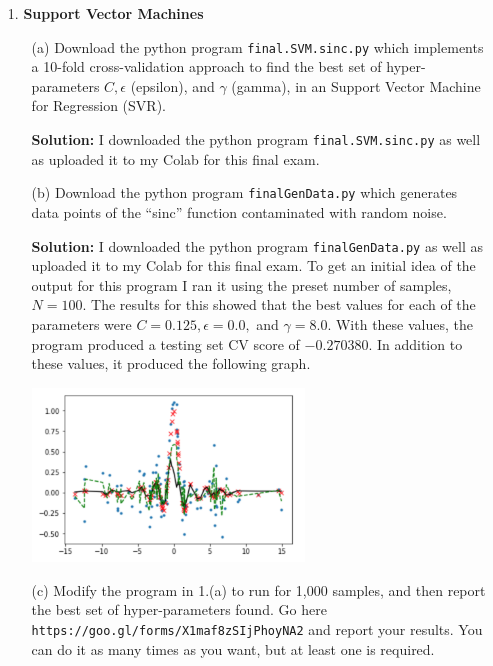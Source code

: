 \documentclass[a4paper]{article}
\begin{document}
\begin{enumerate}
    \item[1.] \textbf{Support Vector Machines}
    \begin{itemize}
        \item[(a)] Download the python program \verb|final.SVM.sinc.py| which implements a 
        10-fold cross-validation approach to find the best set of hyper-parameters $C, \epsilon$ 
        (epsilon), and $\gamma$ (gamma), in an Support Vector Machine for Regression (SVR).

        \textbf{Solution:} I downloaded the python program \verb|final.SVM.sinc.py| as well as 
        uploaded it to my Colab for this final exam.  

        \item[(b)] Download the python program \verb|finalGenData.py| which generates data points 
        of the ``sinc'' function contaminated with random noise.
        
        \textbf{Solution:} I downloaded the python program \verb|finalGenData.py| as well as 
        uploaded it to my Colab for this final exam.  To get an initial idea of the output for 
        this program I ran it using the preset number of samples, $N = 100$.  The results for this 
        showed that the best values for each of the parameters were $C = 0.125, \epsilon = 0.0,$ 
        and $\gamma = 8.0$.  With these values, the program produced a testing set CV score of 
        $-0.270380$.  In addition to these values, it produced the following graph.
        \begin{center}
            \includegraphics[width=0.6\textwidth]{1b-100-graph.jpg}
        \end{center}

        \item[(c)] Modify the program in 1.(a) to run for 1,000 samples, and then report the best 
        set of hyper-parameters found.  Go here  \verb|https://goo.gl/forms/X1maf8zSIjPhoyNA2| and 
        report your results.  You can do it as many times as you want, but at least one is 
        required.
        

\end{itemize}
\end{enumerate}
\end{document}
